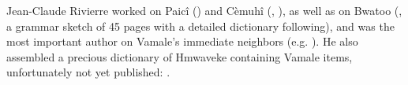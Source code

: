  Jean-Claude Rivierre worked on Paicî (\citeyear{rivierre_dictionnaire_1983}) and Cèmuhî (\citeyear{rivierre_langue_1980}, \citeyear{rivierre_tonogenesis_1993}), as well as on Bwatoo (\citeyear{rivierre_bwatoo_2006}, a grammar sketch of 45 pages with a detailed dictionary following), and was the most important author on Vamale's immediate neighbors (e.g. \citeyear{rivierre_contact_1994}). He also assembled a precious dictionary of Hmwaveke containing Vamale items, unfortunately not yet published: .\largerpage

%
